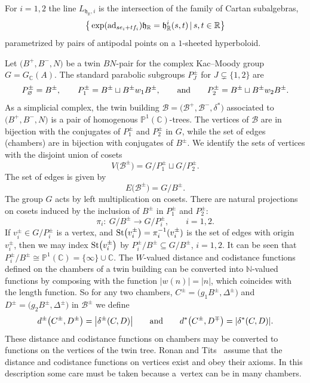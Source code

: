 \documentclass[pdftex]{sigma}
\numberwithin{equation}{section}
\def\C{{\mathbb C}}
\def\P{{\mathbb P}}
\def\R{\mathbb{R}}
\def\N{\mathbb{N}}
\def\cB{\mathcal B}
\def\fh{\mathfrak{h}}
\begin{document}
For $i=1,2$ the line $L_{\fh_\R,i}$ is the intersection of the family of Cartan subalgebras,
\[\big\{\exp({\rm ad}_{se_i+tf_i})\fh_\R = \fh_\R^i(s,t)\, |\, s,t\in\R\big\}\]
parametrized by pairs of antipodal points on a $1$-sheeted hyperboloid.

Let $\big(B^+,B^-,N\big)$ be a twin $BN$-pair for the complex Kac--Moody group $G = G_\C(A)$.
The standard parabolic subgroups $P^\pm_J$ for $J\subsetneq \{1,2\}$ are
\[P^\pm_{\varnothing} = B^\pm, \qquad
P^\pm_1= B^\pm\sqcup B^\pm w_1 B^\pm,\qquad \hbox{and} \qquad
P^\pm_2=B^\pm\sqcup B^\pm w_2 B^\pm.\]
As a simplicial complex, the twin building $\cB = \big(\cB^+,\cB^-,\delta^*\big)$ associated to $\big(B^+,B^-,N\big)$ is a pair of homogenous $\P^1(\C)$-trees. The vertices of $\cB$ are in bijection with the conjugates of $P^\pm_1$ and $P^\pm_2$ in $G$, while the set of edges (chambers) are in bijection with conjugates of $B^\pm$. We identify the sets of vertices with the disjoint union of cosets
\[V\big(\cB^\pm\big) = G/P^\pm_1\sqcup G/P^\pm_2.\]
The set of edges is given by
\[E\big(\cB^\pm\big) = G/B^\pm.\]
The group $G$ acts by left multiplication on cosets. There are natural projections
on cosets induced by the inclusion of $B^\pm$ in $P^\pm_1$ and $P^\pm_2$:
\[\pi_i\colon \ G/B^\pm\longrightarrow G/P^\pm_i,\qquad i=1,2.\]
If $v_i^\pm\in G/P^\pm_i$ is a vertex, and
${\rm St}\big(v_i^\pm\big)=\pi_i^{-1}(v_i^\pm)$ is the set of edges
with origin $v_i^\pm$, then we may index ${\rm St}\big(v_i^\pm\big)$ by $P^\pm_i/B^\pm\subseteq G/B^\pm$, $i=1,2$. It can be seen that $P^\pm_i/B^\pm \cong \P^1(\C) = \{\infty\}\cup\C$.
The $W$-valued distance and codistance functions defined on the chambers of a twin building can be converted into $\N$-valued functions by composing with the function $|w(n)| = |n|$, which coincides with the length function. So for any two chambers, $C^\pm = \big(g_1B^\pm,\Delta^\pm\big)$ and $D^\pm = \big(g_2B^\pm,\Delta^\pm\big)$ in $\cB^\pm$ we define
\[d^\pm\big(C^\pm, D^\pm\big) = \big|\delta^\pm(C,D)\big|\qquad \hbox{and}\qquad d^*\big(C^\pm, D^\mp\big) = |\delta^*(C,D)|.\]
These distance and codistance functions on chambers may be converted to functions on the vertices of the
twin tree. Ronan and Tits~\cite{RonanTits94} assume that the distance and codistance functions on vertices exist and obey their axioms. In this description some care must be taken because a~vertex can be in many chambers.
\end{document}
